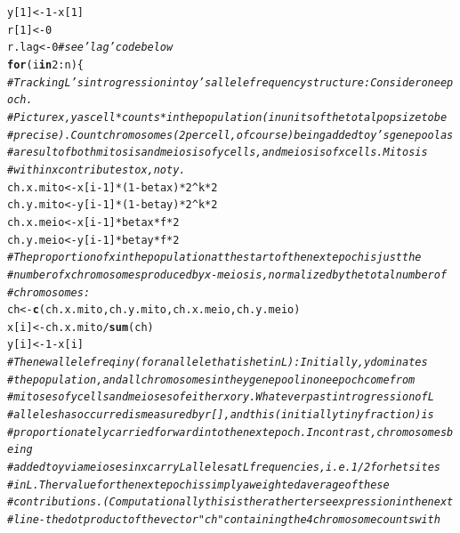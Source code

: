 \documentclass{article}\usepackage[]{graphicx}\usepackage[]{color}
\makeatletter
\newcommand{\hlnum}[1]{\textcolor[rgb]{0.686,0.059,0.569}{#1}}%
\newcommand{\hlcom}[1]{\textcolor[rgb]{0.678,0.584,0.686}{\textit{#1}}}%
\newcommand{\hlopt}[1]{\textcolor[rgb]{0,0,0}{#1}}%
\newcommand{\hlstd}[1]{\textcolor[rgb]{0.345,0.345,0.345}{#1}}%
\newcommand{\hlkwa}[1]{\textcolor[rgb]{0.161,0.373,0.58}{\textbf{#1}}}%
\newcommand{\hlkwb}[1]{\textcolor[rgb]{0.69,0.353,0.396}{#1}}%
\newcommand{\hlkwd}[1]{\textcolor[rgb]{0.737,0.353,0.396}{\textbf{#1}}}%
\newenvironment{kframe}{%
 \def\at@end@of@kframe{}%
 \ifinner\ifhmode%
  \def\at@end@of@kframe{\end{minipage}}%
  \begin{minipage}{\columnwidth}%
 \fi\fi%
 \def\FrameCommand##1{\hskip\@totalleftmargin \hskip-\fboxsep
 \colorbox{shadecolor}{##1}\hskip-\fboxsep
     \hskip-\linewidth \hskip-\@totalleftmargin \hskip\columnwidth}%
 \MakeFramed {\advance\hsize-\width
   \@totalleftmargin\z@ \linewidth\hsize
   \@setminipage}}%
 {\par\unskip\endMakeFramed%
 \at@end@of@kframe}
\newenvironment{knitrout}{}{} %
\makeatother
\begin{document}
\begin{knitrout}
\begin{kframe}
\begin{alltt}
  \hlstd{y[}\hlnum{1}\hlstd{]}  \hlkwb{<-} \hlnum{1}\hlopt{-}\hlstd{x[}\hlnum{1}\hlstd{]}
  \hlstd{r[}\hlnum{1}\hlstd{]}  \hlkwb{<-} \hlnum{0}
  \hlstd{r.lag} \hlkwb{<-} \hlnum{0}           \hlcom{# see 'lag' code below}
  \hlkwa{for}\hlstd{(i} \hlkwa{in} \hlnum{2}\hlopt{:}\hlstd{n)\{}
    \hlcom{# Tracking L's introgression into y's allele frequency structure: Consider one epoch. }
    \hlcom{# Picture x,y as cell *counts* in the population (in units of the total pop size to be}
    \hlcom{# precise). Count chromosomes (2 per cell, of course) being added to y's gene pool as}
    \hlcom{# a result of both mitosis and meiosis of y cells, and meiosis of x cells. Mitosis}
    \hlcom{# within x contributes to x, not y.  }
    \hlstd{ch.x.mito} \hlkwb{<-} \hlstd{x[i}\hlopt{-}\hlnum{1}\hlstd{]} \hlopt{*} \hlstd{(}\hlnum{1}\hlopt{-}\hlstd{betax)} \hlopt{*} \hlnum{2}\hlopt{^}\hlstd{k} \hlopt{*} \hlnum{2}
    \hlstd{ch.y.mito} \hlkwb{<-} \hlstd{y[i}\hlopt{-}\hlnum{1}\hlstd{]} \hlopt{*} \hlstd{(}\hlnum{1}\hlopt{-}\hlstd{betay)} \hlopt{*} \hlnum{2}\hlopt{^}\hlstd{k} \hlopt{*} \hlnum{2}
    \hlstd{ch.x.meio} \hlkwb{<-} \hlstd{x[i}\hlopt{-}\hlnum{1}\hlstd{]} \hlopt{*} \hlstd{betax} \hlopt{*} \hlstd{f} \hlopt{*} \hlnum{2}
    \hlstd{ch.y.meio} \hlkwb{<-} \hlstd{y[i}\hlopt{-}\hlnum{1}\hlstd{]} \hlopt{*} \hlstd{betay} \hlopt{*} \hlstd{f} \hlopt{*} \hlnum{2}
    \hlcom{# The proportion of x in the population at the start of the next epoch is just the}
    \hlcom{# number of x chromosomes produced by x-meiosis, normalized by the total number of}
    \hlcom{# chromosomes:}
    \hlstd{ch} \hlkwb{<-} \hlkwd{c}\hlstd{(ch.x.mito, ch.y.mito, ch.x.meio, ch.y.meio)}
    \hlstd{x[i]} \hlkwb{<-} \hlstd{ch.x.mito}\hlopt{/}\hlkwd{sum}\hlstd{(ch)}
    \hlstd{y[i]} \hlkwb{<-} \hlnum{1} \hlopt{-} \hlstd{x[i]}
    \hlcom{# The new allele freq in y (for an allele that is het in L): Initially, y dominates }
    \hlcom{# the population, and all chromosomes in the y gene pool in one epoch come from }
    \hlcom{# mitoses of y cells and meioses of either x or y.  Whatever past introgression of L }
    \hlcom{# alleles has occurred is measured by r[], and this (initially tiny fraction) is }
    \hlcom{# proportionately carried forward into the next epoch. In contrast, chromosomes being }
    \hlcom{# added to y via meioses in x carry L alleles at L frequencies, i.e. 1/2 for het sites}
    \hlcom{# in L.  The r value for the next epoch is simply a weighted average of these }
    \hlcom{# contributions.  (Computationally this is the rather terse expression in the next }
    \hlcom{# line - the dot product of the vector "ch" containing the 4 chromosome counts with }

\end{alltt}
\end{kframe}
\end{knitrout}
\end{document}
